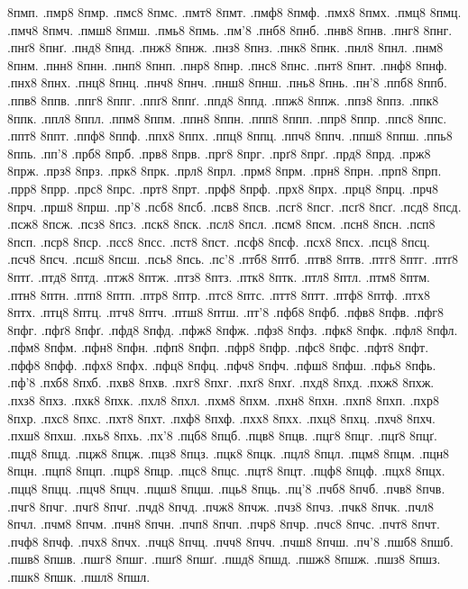 {8пмп.
.пмр8
8пмр.
.пмс8
8пмс.
.пмт8
8пмт.
.пмф8
8пмф.
.пмх8
8пмх.
.пмц8
8пмц.
.пмч8
8пмч.
.пмш8
8пмш.
.пмь8
8пмь.
.пм'8
.пнб8
8пнб.
.пнв8
8пнв.
.пнг8
8пнг.
.пнґ8
8пнґ.
.пнд8
8пнд.
.пнж8
8пнж.
.пнз8
8пнз.
.пнк8
8пнк.
.пнл8
8пнл.
.пнм8
8пнм.
.пнн8
8пнн.
.пнп8
8пнп.
.пнр8
8пнр.
.пнс8
8пнс.
.пнт8
8пнт.
.пнф8
8пнф.
.пнх8
8пнх.
.пнц8
8пнц.
.пнч8
8пнч.
.пнш8
8пнш.
.пнь8
8пнь.
.пн'8
.ппб8
8ппб.
.ппв8
8ппв.
.ппг8
8ппг.
.ппґ8
8ппґ.
.ппд8
8ппд.
.ппж8
8ппж.
.ппз8
8ппз.
.ппк8
8ппк.
.ппл8
8ппл.
.ппм8
8ппм.
.ппн8
8ппн.
.ппп8
8ппп.
.ппр8
8ппр.
.ппс8
8ппс.
.ппт8
8ппт.
.ппф8
8ппф.
.ппх8
8ппх.
.ппц8
8ппц.
.ппч8
8ппч.
.ппш8
8ппш.
.ппь8
8ппь.
.пп'8
.прб8
8прб.
.прв8
8прв.
.прг8
8прг.
.прґ8
8прґ.
.прд8
8прд.
.прж8
8прж.
.прз8
8прз.
.прк8
8прк.
.прл8
8прл.
.прм8
8прм.
.прн8
8прн.
.прп8
8прп.
.прр8
8прр.
.прс8
8прс.
.прт8
8прт.
.прф8
8прф.
.прх8
8прх.
.прц8
8прц.
.прч8
8прч.
.прш8
8прш.
.пр'8
.псб8
8псб.
.псв8
8псв.
.псг8
8псг.
.псґ8
8псґ.
.псд8
8псд.
.псж8
8псж.
.псз8
8псз.
.пск8
8пск.
.псл8
8псл.
.псм8
8псм.
.псн8
8псн.
.псп8
8псп.
.пср8
8пср.
.псс8
8псс.
.пст8
8пст.
.псф8
8псф.
.псх8
8псх.
.псц8
8псц.
.псч8
8псч.
.псш8
8псш.
.псь8
8псь.
.пс'8
.птб8
8птб.
.птв8
8птв.
.птг8
8птг.
.птґ8
8птґ.
.птд8
8птд.
.птж8
8птж.
.птз8
8птз.
.птк8
8птк.
.птл8
8птл.
.птм8
8птм.
.птн8
8птн.
.птп8
8птп.
.птр8
8птр.
.птс8
8птс.
.птт8
8птт.
.птф8
8птф.
.птх8
8птх.
.птц8
8птц.
.птч8
8птч.
.птш8
8птш.
.пт'8
.пфб8
8пфб.
.пфв8
8пфв.
.пфг8
8пфг.
.пфґ8
8пфґ.
.пфд8
8пфд.
.пфж8
8пфж.
.пфз8
8пфз.
.пфк8
8пфк.
.пфл8
8пфл.
.пфм8
8пфм.
.пфн8
8пфн.
.пфп8
8пфп.
.пфр8
8пфр.
.пфс8
8пфс.
.пфт8
8пфт.
.пфф8
8пфф.
.пфх8
8пфх.
.пфц8
8пфц.
.пфч8
8пфч.
.пфш8
8пфш.
.пфь8
8пфь.
.пф'8
.пхб8
8пхб.
.пхв8
8пхв.
.пхг8
8пхг.
.пхґ8
8пхґ.
.пхд8
8пхд.
.пхж8
8пхж.
.пхз8
8пхз.
.пхк8
8пхк.
.пхл8
8пхл.
.пхм8
8пхм.
.пхн8
8пхн.
.пхп8
8пхп.
.пхр8
8пхр.
.пхс8
8пхс.
.пхт8
8пхт.
.пхф8
8пхф.
.пхх8
8пхх.
.пхц8
8пхц.
.пхч8
8пхч.
.пхш8
8пхш.
.пхь8
8пхь.
.пх'8
.пцб8
8пцб.
.пцв8
8пцв.
.пцг8
8пцг.
.пцґ8
8пцґ.
.пцд8
8пцд.
.пцж8
8пцж.
.пцз8
8пцз.
.пцк8
8пцк.
.пцл8
8пцл.
.пцм8
8пцм.
.пцн8
8пцн.
.пцп8
8пцп.
.пцр8
8пцр.
.пцс8
8пцс.
.пцт8
8пцт.
.пцф8
8пцф.
.пцх8
8пцх.
.пцц8
8пцц.
.пцч8
8пцч.
.пцш8
8пцш.
.пць8
8пць.
.пц'8
.пчб8
8пчб.
.пчв8
8пчв.
.пчг8
8пчг.
.пчґ8
8пчґ.
.пчд8
8пчд.
.пчж8
8пчж.
.пчз8
8пчз.
.пчк8
8пчк.
.пчл8
8пчл.
.пчм8
8пчм.
.пчн8
8пчн.
.пчп8
8пчп.
.пчр8
8пчр.
.пчс8
8пчс.
.пчт8
8пчт.
.пчф8
8пчф.
.пчх8
8пчх.
.пчц8
8пчц.
.пчч8
8пчч.
.пчш8
8пчш.
.пч'8
.пшб8
8пшб.
.пшв8
8пшв.
.пшг8
8пшг.
.пшґ8
8пшґ.
.пшд8
8пшд.
.пшж8
8пшж.
.пшз8
8пшз.
.пшк8
8пшк.
.пшл8
8пшл.
}
